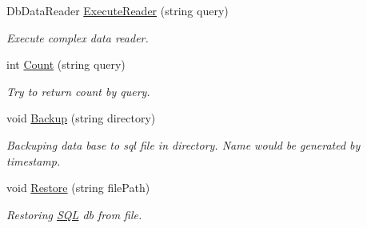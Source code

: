 \begin{DoxyCompactItemize}
Db\+Data\+Reader \mbox{\hyperlink{class_uniform_data_operator_1_1_s_q_l_1_1_my_s_q_l_1_1_my_s_q_l_data_operator_aef1f1d171818fffe2f0c0642de27596d}{Execute\+Reader}} (string query)
\begin{DoxyCompactList}\small\item\em Execute complex data reader. \end{DoxyCompactList}\item 
int \mbox{\hyperlink{class_uniform_data_operator_1_1_s_q_l_1_1_my_s_q_l_1_1_my_s_q_l_data_operator_a05cba564076cc8506ab0272b29f96098}{Count}} (string query)
\begin{DoxyCompactList}\small\item\em Try to return count by query. \end{DoxyCompactList}\item 
void \mbox{\hyperlink{class_uniform_data_operator_1_1_s_q_l_1_1_my_s_q_l_1_1_my_s_q_l_data_operator_a3684b6d5abbcde94880ef433a8ffb28f}{Backup}} (string directory)
\begin{DoxyCompactList}\small\item\em Backuping data base to sql file in directory. Name would be generated by timestamp. \end{DoxyCompactList}\item 
void \mbox{\hyperlink{class_uniform_data_operator_1_1_s_q_l_1_1_my_s_q_l_1_1_my_s_q_l_data_operator_a469885c20c44b1b83d7edc46cda6d539}{Restore}} (string file\+Path)
\begin{DoxyCompactList}\small\item\em Restoring \mbox{\hyperlink{namespace_uniform_data_operator_1_1_s_q_l}{S\+QL}} db from file. \end{DoxyCompactList}\end{DoxyCompactItemize}
